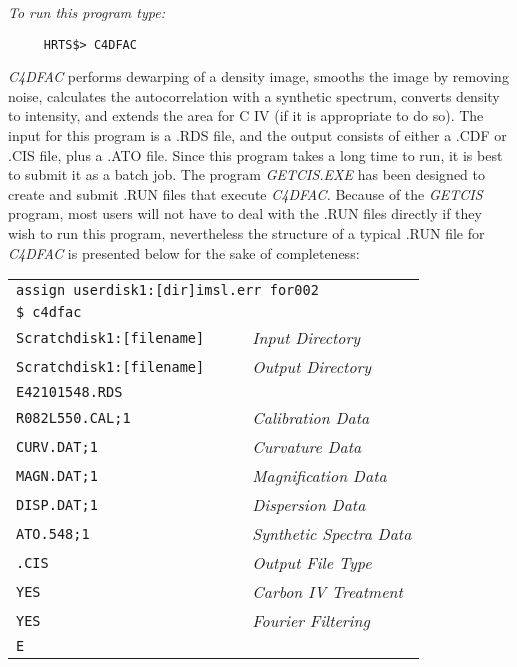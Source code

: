 {\em To run this program type:}
\begin{verbatim}
     HRTS$> C4DFAC             
\end{verbatim}   
{\em C4DFAC} performs dewarping of a density image, smooths the image by
   removing noise, calculates the autocorrelation with a synthetic
   spectrum, converts density to intensity, and extends the area for C IV
   (if it is appropriate to do so).  The input for this program is a .RDS
   file, and the output consists of either a .CDF or .CIS file, plus a
   .ATO file.  Since this program takes a long time to run, it is best to
   submit it as a batch job.  The program {\em GETCIS.EXE} has been designed to
   create and submit .RUN files that execute {\em C4DFAC.}  Because of the
{\em GETCIS} program, most users will not have to deal with the .RUN files
   directly if they wish to run this program, nevertheless the structure
   of a typical .RUN file for {\em C4DFAC} is presented below for the sake of
   completeness:
\begin{center}   
\begin{tabular}{||l l l l l||}
\hline
\multicolumn{5}{||l||}{\tt assign userdisk1:[dir]imsl.err for002} \\
{\tt \$ c4dfac} & & & & \\                                                      
{\tt Scratchdisk1:[filename]} &  &  &  \multicolumn{2}{l||}{\em Input Directory} 
 \\
{\tt Scratchdisk1:[filename]} &  &  &  \multicolumn{2}{l||}{\em Output 
Directory} \\
\hline
{\tt E42101548.RDS} &  &  &  &  \\                                         
{\tt R082L550.CAL;1} &  &  &  \multicolumn{2}{l||}{\em Calibration Data} \\ 
{\tt CURV.DAT;1} &  &  &  \multicolumn{2}{l||}{\em Curvature Data} \\ 
{\tt MAGN.DAT;1} &  &  &  \multicolumn{2}{l||}{\em Magnification Data} \\ 
{\tt DISP.DAT;1} &  &  &  \multicolumn{2}{l||}{\em Dispersion Data} \\ 
{\tt ATO.548;1}  &  &  &  \multicolumn{2}{l||}{\em Synthetic Spectra Data} \\  
{\tt .CIS} &  &  &  \multicolumn{2}{l||}{\em Output File Type} \\ 
{\tt YES}  &  &  &  \multicolumn{2}{l||}{\em Carbon IV Treatment} \\ 
{\tt YES}  &  &  &  \multicolumn{2}{l||}{\em Fourier Filtering} \\ 
\hline
{\tt E} &  &  &  &  \\
\hline                                                                      
\end{tabular}
\end{center}
   
